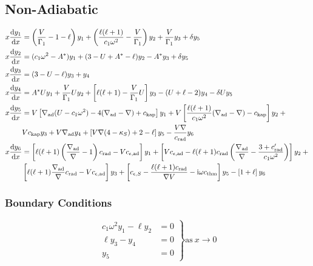 \documentclass[fleqn]{article}
\newcommand{\diff}{\ensuremath{\mathrm{d}}}
\newcommand{\ii}{\ensuremath{\mathrm{i}}}
\newcommand{\Vg}{\ensuremath{\frac{V}{\Gamma_{1}}}}
\newcommand{\As}{\ensuremath{A^{\ast}}}
\newcommand{\nabad}{\ensuremath{\nabla_{\rm ad}}}
\newcommand{\kapS}{\ensuremath{\kappa_{S}}}
\newcommand{\crad}{\ensuremath{c_{\rm rad}}}
\newcommand{\cepsad}{\ensuremath{c_{\epsilon,{\rm ad}}}}
\newcommand{\cepsS}{\ensuremath{c_{\epsilon,S}}}
\newcommand{\cthm}{\ensuremath{c_{\rm thm}}}
\newcommand{\ckap}{\ensuremath{c_{\rm kap}}}
\begin{document}
\subsection*{Non-Adiabatic}

\begin{align*}
x \frac{\diff y_{1}}{\diff x} &=
\left(\Vg - 1 - \ell \right) y_{1} +
\left(\frac{\ell(\ell+1)}{c_{1} \omega^{2}} - \Vg \right) y_{2} +
\Vg y_{3} +
\delta y_{5} \\
x \frac{\diff y_{2}}{\diff x} &=
(c_{1} \omega^{2} - \As ) y_{1} +
(3 - U + \As - \ell) y_{2} -
\As y_{3} +
\delta y_{5} \\
x \frac{\diff y_{3}}{\diff x} &=
(3 - U - \ell) y_{3} +
y_{4} \\
x \frac{\diff y_{4}}{\diff x} &=
\As U y_{1} +
\Vg U y_{2} +
\left[ \ell(\ell+1) - \Vg U \right] y_{3} -
(U + \ell - 2) y_{4}
- \delta U y_{5} \\
x \frac{\diff y_{5}}{\diff x} &=
V \left[ \nabad (U - c_{1}\omega^{2}) - 4 (\nabad - \nabla) + \ckap \right] y_{1} + 
V \left[ \frac{\ell(\ell+1)}{c_{1} \omega^{2}} (\nabad - \nabla) - \ckap \right] y_{2} + \mbox{} \\
& 
V \ckap y_{3} + 
V \nabad y_{4} + 
\left[ V \nabla (4 - \kapS) + 2 - \ell \right] y_{5} -
\frac{V \nabla}{\crad} y_{6} \\
x \frac{\diff y_{6}}{\diff x} &=
\left[ \ell(\ell+1)\left( \frac{\nabad}{\nabla} - 1 \right) \crad - V \cepsad \right] y_{1} +
\left[ V \cepsad - \ell(\ell+1)\crad \left( \frac{\nabad}{\nabla} - \frac{3 + \crad'}{c_{1}\omega^{2}} \right) \right] y_{2} + \mbox{} \\
&
\left[ \ell(\ell+1) \frac{\nabad}{\nabla} \crad - V \cepsad \right] y_{3} +
\left[ \cepsS - \frac{\ell(\ell+1)\crad}{\nabla V} - \ii \omega \cthm\right] y_{5} -
\left[ 1 + \ell \right] y_{6}
\end{align*}

\subsubsection*{Boundary Conditions}

\begin{equation*}
\left.
\begin{aligned}
c_{1} \omega^{2} y_{1} - \ell y_{2} &= 0 \\
\ell y_{3} - y_{4} &= 0 \\
y_{5} &= 0
\end{aligned}
\right\}
\text{as}\ x \rightarrow 0
\end{equation*}
\end{document}
